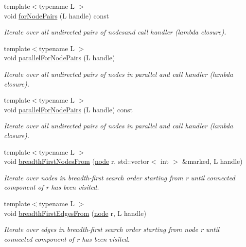 \begin{DoxyCompactItemize}
{\footnotesize template$<$typename L $>$ }\\void \hyperlink{class_ensemble_clustering_1_1_graph_a034e839b6ee5fd1b9226afb02e0c2c81}{for\-Node\-Pairs} (L handle) const 
\begin{DoxyCompactList}\small\item\em Iterate over all undirected pairs of nodesand call handler (lambda closure). \end{DoxyCompactList}\item 
{\footnotesize template$<$typename L $>$ }\\void \hyperlink{class_ensemble_clustering_1_1_graph_ac3c5153a917864d21d324ac68805d716}{parallel\-For\-Node\-Pairs} (L handle)
\begin{DoxyCompactList}\small\item\em Iterate over all undirected pairs of nodes in parallel and call handler (lambda closure). \end{DoxyCompactList}\item 
{\footnotesize template$<$typename L $>$ }\\void \hyperlink{class_ensemble_clustering_1_1_graph_a48c278625513a73576acad946174355d}{parallel\-For\-Node\-Pairs} (L handle) const 
\begin{DoxyCompactList}\small\item\em Iterate over all undirected pairs of nodes in parallel and call handler (lambda closure). \end{DoxyCompactList}\item 
{\footnotesize template$<$typename L $>$ }\\void \hyperlink{class_ensemble_clustering_1_1_graph_ab35e13f8f00b5dcf76a82f836fbf51c8}{breadth\-First\-Nodes\-From} (\hyperlink{namespace_ensemble_clustering_ae829290aeccd1a420b17a37fd901f114}{node} r, std\-::vector$<$ int $>$ \&marked, L handle)
\begin{DoxyCompactList}\small\item\em Iterate over nodes in breadth-\/first search order starting from r until connected component of r has been visited. \end{DoxyCompactList}\item 
{\footnotesize template$<$typename L $>$ }\\void \hyperlink{class_ensemble_clustering_1_1_graph_a117760776caae55de5575eda7e0c2e6e}{breadth\-First\-Edges\-From} (\hyperlink{namespace_ensemble_clustering_ae829290aeccd1a420b17a37fd901f114}{node} r, L handle)
\begin{DoxyCompactList}\small\item\em Iterate over edges in breadth-\/first search order starting from node r until connected component of r has been visited. \end{DoxyCompactList}\item 

\end{DoxyCompactItemize}
